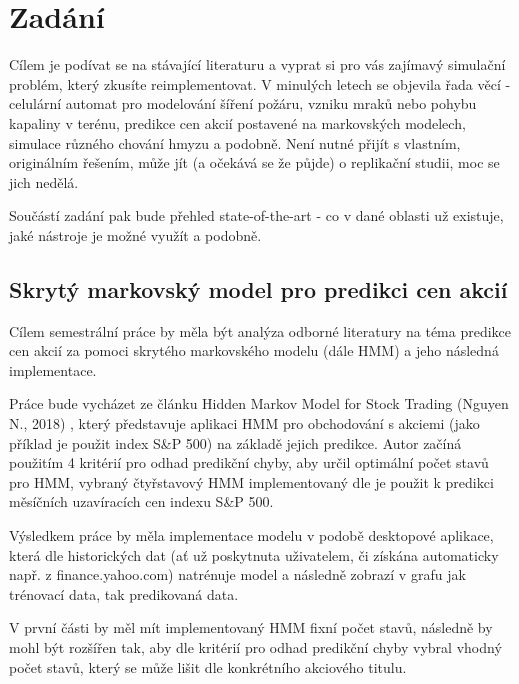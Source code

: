 \section{Zadání}

Cílem je podívat se na stávající literaturu a vyprat si pro vás zajímavý simulační problém, který zkusíte reimplementovat. V minulých letech se objevila řada věcí - celulární automat pro modelování šíření požáru, vzniku mraků nebo pohybu kapaliny v terénu, predikce cen akcií postavené na markovských modelech, simulace různého chování hmyzu a podobně. Není nutné přijít s vlastním, originálním řešením, může jít (a očekává se že půjde) o replikační studii, moc se jich nedělá.

Součástí zadání pak bude přehled state-of-the-art - co v dané oblasti už existuje, jaké nástroje je možné využít a podobně.

\subsection{Skrytý markovský model pro predikci cen akcií}

Cílem semestrální práce by měla být analýza odborné literatury na téma predikce cen akcií za pomoci skrytého markovského modelu (dále HMM) a jeho následná implementace.

Práce bude vycházet ze článku Hidden Markov Model for Stock Trading (Nguyen N., 2018) \cite{Nguyen}, který představuje aplikaci HMM pro obchodování s akciemi (jako příklad je použit index S\&P 500) na základě jejich predikce. Autor začíná použitím 4 kritérií pro odhad predikční chyby, aby určil optimální počet stavů pro HMM, vybraný čtyřstavový HMM implementovaný dle \cite{Hassan} je použit k predikci měsíčních uzavíracích cen indexu S\&P 500.

Výsledkem práce by měla implementace modelu v podobě desktopové aplikace, která dle historických dat (ať už poskytnuta uživatelem, či získána automaticky např. z finance.yahoo.com) natrénuje model a následně zobrazí v grafu jak trénovací data, tak predikovaná data.

V první části by měl mít implementovaný HMM fixní počet stavů, následně by mohl být rozšířen tak, aby dle kritérií pro odhad predikční chyby vybral vhodný počet stavů, který se může lišit dle konkrétního akciového titulu.

\clearpage
